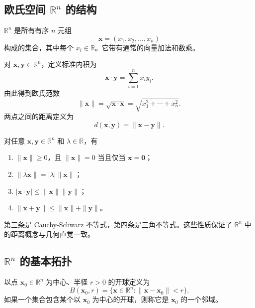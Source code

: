 \subsection{欧氏空间 \texorpdfstring{$\mathbb{R}^n$}{Rn} 的结构}

\begin{definition}[欧氏空间]
$\mathbb{R}^n$ 是所有有序 $n$ 元组
\[
    \mathbf{x}=(x_1,x_2,\dots,x_n)
\]
构成的集合，其中每个 $x_i\in\mathbb{R}$。它带有通常的向量加法和数乘。
\end{definition}

\begin{definition}[内积与范数]
对 $\mathbf{x},\mathbf{y}\in\mathbb{R}^n$，定义标准内积为
\[
    \mathbf{x}\cdot\mathbf{y}=\sum_{i=1}^{n}x_iy_i.
\]
由此得到欧氏范数
\[
    \|\mathbf{x}\|=\sqrt{\mathbf{x}\cdot\mathbf{x}}
    =\sqrt{x_1^2+\cdots+x_n^2}.
\]
两点之间的距离定义为
\[
    d(\mathbf{x},\mathbf{y})=\|\mathbf{x}-\mathbf{y}\|.
\]
\end{definition}

\begin{property}
对任意 $\mathbf{x},\mathbf{y}\in\mathbb{R}^n$ 和 $\lambda\in\mathbb{R}$，有
\begin{enumerate}
    \item $\|\mathbf{x}\|\geq0$，且 $\|\mathbf{x}\|=0$ 当且仅当 $\mathbf{x}=\mathbf{0}$；
    \item $\|\lambda\mathbf{x}\|=|\lambda|\|\mathbf{x}\|$；
    \item $|\mathbf{x}\cdot\mathbf{y}|\leq \|\mathbf{x}\|\|\mathbf{y}\|$；
    \item $\|\mathbf{x}+\mathbf{y}\|\leq\|\mathbf{x}\|+\|\mathbf{y}\|$。
\end{enumerate}
\end{property}

第三条是 Cauchy-Schwarz 不等式，第四条是三角不等式。这些性质保证了 $\mathbb{R}^n$ 中的距离概念与几何直觉一致。

\subsection{\texorpdfstring{$\mathbb{R}^n$}{Rn} 的基本拓扑}

\begin{definition}[邻域与开球]
以点 $\mathbf{x}_0\in\mathbb{R}^n$ 为中心、半径 $r>0$ 的开球定义为
\[
    B(\mathbf{x}_0,r)=\{\mathbf{x}\in\mathbb{R}^n:\|\mathbf{x}-\mathbf{x}_0\|<r\}.
\]
如果一个集合包含某个以 $\mathbf{x}_0$ 为中心的开球，则称它是 $\mathbf{x}_0$ 的一个邻域。
\end{definition}

